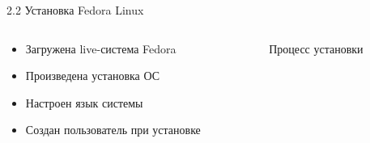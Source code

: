 \documentclass[
  ignorenonframetext,
  aspectratio=169,
  russian,
]{beamer}
\providecommand{\tightlist}{%
  \setlength{\itemsep}{0pt}\setlength{\parskip}{0pt}}
\begin{document}
\begin{block}{2.2 Установка Fedora Linux}
\label{ux443ux441ux442ux430ux43dux43eux432ux43aux430-fedora-linux}
\begin{columns}[c]
\begin{column}{0.7\linewidth}
\begin{itemize}[<+->]
\tightlist
\item
  Загружена live-система Fedora
\item
  Произведена установка ОС
\item
  Настроен язык системы
\item
  Создан пользователь при установке
\end{itemize}
\end{column}

\begin{column}{0.3\linewidth}
\begin{figure}


\caption{\label{fig-install}Процесс установки}

\end{figure}%
\end{column}
\end{columns}
\end{block}
\end{document}

